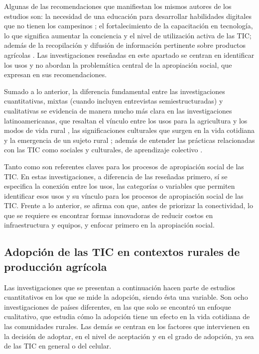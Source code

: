 \documentclass[spanish]{textolivre}
\begin{document}
Algunas de las recomendaciones que manifiestan los mismos autores de los estudios son: la necesidad de una educación para desarrollar habilidades digitales que no tienen los campesinos \cite{khan_farmers_2020,vong_empowering_2019}; el fortalecimiento de la capacitación en tecnología, lo que significa aumentar la conciencia y el nivel de utilización activa de las TIC; además de la recopilación y difusión de información pertinente sobre productos agrícolas \cite{sheng_influence_2020,ma_smartphone_2020}. Las investigaciones reseñadas en este apartado se centran en identificar los usos y no abordan la problemática central de la apropiación social, que expresan en sus recomendaciones.

Sumado a lo anterior, la diferencia fundamental entre las investigaciones cuantitativas, mixtas (cuando incluyen entrevistas semiestructuradas) y cualitativas se evidencia de manera mucho más clara en las investigaciones latinoamericanas, que resaltan el vínculo entre los usos para la agricultura y los modos de vida rural \cite{urcola_articulacion_2012}, las significaciones culturales que surgen en la vida cotidiana \cite{zapata_-_cardenas_ruralidad_2015} y la emergencia de un sujeto rural \cite{matellanes-lazo_uso_2015}; además de entender las prácticas relacionadas con las TIC como sociales y culturales, de aprendizaje colectivo \cite{santini_uso_2018}.

Tanto \textcite{urcola_articulacion_2012} como \textcite{santini_uso_2018} son referentes claves para los procesos de apropiación social de las TIC. En estas investigaciones, a diferencia de las reseñadas primero, sí se especifica la conexión entre los usos, las categorías o variables que permiten identificar esos usos y su vínculo para los procesos de apropiación social de las TIC. Frente a lo anterior, se afirma con \textcite{bowman_technological_2019} que, antes de priorizar la conectividad, lo que se requiere es encontrar formas innovadoras de reducir costos en infraestructura y equipos, y enfocar primero en la apropiación social.

\subsection{Adopción de las TIC en contextos rurales de producción agrícola}

Las investigaciones que se presentan a continuación hacen parte de estudios cuantitativos en los que se mide la adopción, siendo ésta una variable. Son ocho investigaciones de países diferentes, en las que solo se encontró un enfoque cualitativo, que estudia cómo la adopción tiene un efecto en la vida cotidiana de las comunidades rurales. Las demás se centran en los factores que intervienen en la decisión de adoptar, en el nivel de aceptación y en el grado de adopción, ya sea de las TIC en general o del celular. 
\end{document}
